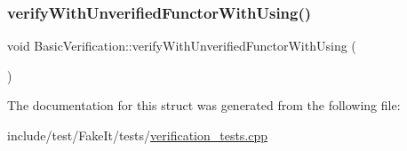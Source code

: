 \mbox{\label{structBasicVerification_af00d59bfab657bcce9db7182190a67f2}} 
\subsubsection{\texorpdfstring{verifyWithUnverifiedFunctorWithUsing()}{verifyWithUnverifiedFunctorWithUsing()}}
{\footnotesize\ttfamily void Basic\+Verification\+::verify\+With\+Unverified\+Functor\+With\+Using (\begin{DoxyParamCaption}{ }\end{DoxyParamCaption})\hspace{0.3cm}{\ttfamily [inline]}}



The documentation for this struct was generated from the following file\+:\begin{DoxyCompactItemize}
\item 
include/test/\+Fake\+It/tests/\mbox{\hyperlink{verification__tests_8cpp}{verification\+\_\+tests.\+cpp}}\end{DoxyCompactItemize}
